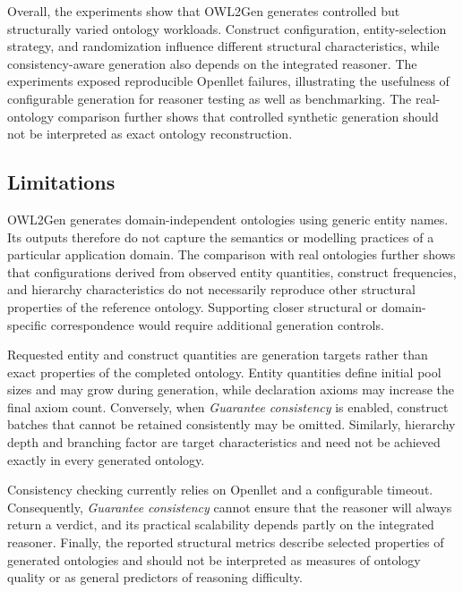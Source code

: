 \vspace{1em}
\noindent
Overall, the experiments show that OWL2Gen generates controlled but
structurally varied ontology workloads. Construct configuration,
entity-selection strategy, and randomization influence different structural
characteristics, while consistency-aware generation also depends on the
integrated reasoner. The experiments exposed reproducible Openllet failures,
illustrating the usefulness of configurable generation for reasoner testing
as well as benchmarking. The real-ontology comparison further shows that
controlled synthetic generation should not be interpreted as exact ontology
reconstruction.


\subsection{Limitations}
\label{sec:owl2gendl_limitations}

OWL2Gen generates domain-independent ontologies using generic entity names.
Its outputs therefore do not capture the semantics or modelling practices
of a particular application domain. The comparison with real ontologies
further shows that configurations derived from observed entity quantities,
construct frequencies, and hierarchy characteristics do not necessarily
reproduce other structural properties of the reference ontology. Supporting
closer structural or domain-specific correspondence would require
additional generation controls.

Requested entity and construct quantities are generation targets rather
than exact properties of the completed ontology. Entity quantities define
initial pool sizes and may grow during generation, while declaration axioms
may increase the final axiom count. Conversely, when
\emph{Guarantee consistency} is enabled, construct batches that cannot be
retained consistently may be omitted. Similarly, hierarchy depth and
branching factor are target characteristics and need not be achieved
exactly in every generated ontology.

Consistency checking currently relies on Openllet and a configurable
timeout. Consequently, \emph{Guarantee consistency} cannot ensure that the
reasoner will always return a verdict, and its practical scalability
depends partly on the integrated reasoner. Finally, the reported structural
metrics describe selected properties of generated ontologies and should
not be interpreted as measures of ontology quality or as general
predictors of reasoning difficulty.